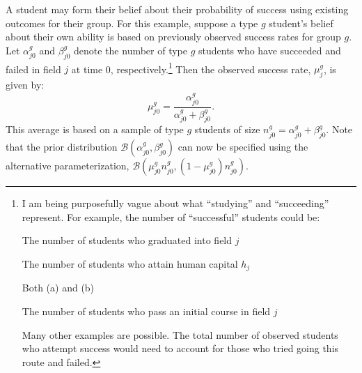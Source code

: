 \documentclass[10 pt]{article}
\newcommand{\pr}[1]{\left( #1 \right)}
\begin{document}
\begin{blist}
\item 
A student may form their belief about their probability of success using existing outcomes for their group.
For this example, suppose a type $g$ student's belief about their own ability is based on previously observed success rates for group $g$. 
Let $\alpha_{j0}^g$ and $\beta_{j0}^g$ denote the number of type $g$ students who have succeeded and failed in field $j$ at time 0, respectively.\footnote{
   I am being purposefully vague about what ``studying'' and ``succeeding'' represent.
   For example, the number of ``successful'' students could be:
   \begin{footcount}
      \item The number of students who graduated into field $j$
      \item The number of students who attain human capital $h_j$
      \item Both (a) and (b)
      \item The number of students who pass an initial course in field $j$
    \end{footcount} 
   Many other examples are possible. The total number of observed students who attempt success would need to account for those who tried going this route and failed. 
}  
Then the observed success rate, $\mu_{j}^g$, is given by:
\begin{equation*}
\mu_{j0}^g = 
  \frac{\alpha_{j0}^g}{\alpha_{j0}^g + \beta_{j0}^g}.
\end{equation*}
This average is based on a sample of type $g$ students of size $n_{j0}^g = \alpha_{j0}^g + \beta_{j0}^g$.
Note that the prior distribution $\mathcal{B} \pr{\alpha_{j0}^g, \beta_{j0}^g}$ can now be specified using the alternative parameterization, $\mathcal{B} \pr{\mu_{j0}^g n_{j0}^g, (1 - \mu_{j0}^g) n_{j0}^g}$.


\end{blist}
\end{document}
